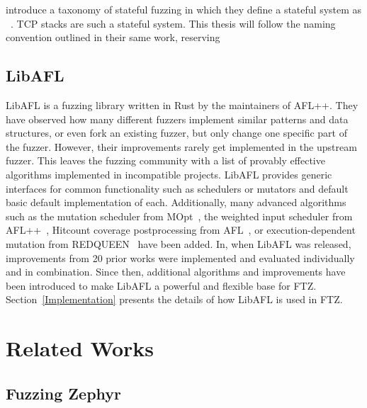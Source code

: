 \documentclass{article}
\newcommand{\proj}{FTZ\xspace}
\let\savedCite=\cite
\renewcommand{\cite}{\unskip~\savedCite}
\begin{document}
\begin{multicols}{2}
  \citeauthor{StatefulReview} introduce a taxonomy of stateful fuzzing in which they define a stateful system as \cite{StatefulReview}. TCP stacks are such a stateful system. This thesis will follow the naming convention outlined in their same work, reserving \cite{StatefulReview}

  \subsection{LibAFL}

  LibAFL is a fuzzing library written in Rust by the maintainers of AFL++. They have observed how many different fuzzers implement similar patterns and data structures, or even fork an existing fuzzer, but only change one specific part of the fuzzer. However,  their improvements rarely get implemented in the upstream fuzzer. This leaves the fuzzing community with a list of provably effective algorithms implemented in incompatible projects. LibAFL provides generic interfaces for common functionality such as schedulers or mutators and default basic default implementation of each.
  Additionally, many advanced algorithms such as the mutation scheduler from MOpt\cite{MOpt}, the weighted input scheduler from AFL++\cite{AFLPlusPlus}, Hitcount coverage postprocessing from AFL\cite{AFL}, or execution-dependent mutation from REDQUEEN\cite{REDQUEEN} have been added. In, when LibAFL was released, improvements from 20 prior works were implemented and evaluated individually and in combination. Since then, additional algorithms and improvements have been introduced to make LibAFL a powerful and flexible base for \proj. Section~\ref{Implementation} presents the details of how LibAFL is used in \proj.\cite{LibAFL}


  \section{Related Works}
  \label{RelatedWorks}

  \subsection{Fuzzing Zephyr}


\end{multicols}
\end{document}
